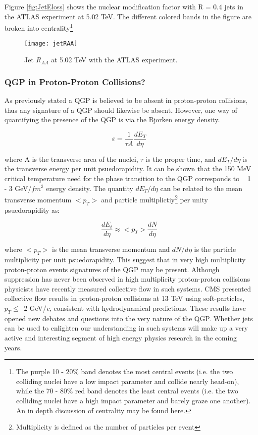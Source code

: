 Figure \ref{fig:JetEloss} shows the nuclear modification factor with R = 0.4 jets in the ATLAS experiment at 5.02 TeV\cite{Aaboud:2018twu}.  The different colored bands in the figure are broken into centrality\footnote{The purple 10 - 20\% band denotes the most central events (i.e. the two colliding nuclei have a low impact parameter and collide nearly head-on), while the 70 - 80\% red band denotes the least central events (i.e. the two colliding nuclei have a high impact parameter and barely graze one another).  An in depth discussion of centrality may be found here\cite{Klochkov_2017}.}

\begin{figure}[h]
\texttt{[image: jetRAA]}
\centering
\caption{Jet $R_{AA}$ at 5.02 TeV with the ATLAS experiment\cite{Aaboud:2018twu}.}
\label{fig:JetRAA}
\end{figure}



\subsubsection{QGP in Proton-Proton Collisions?}
As previously stated a QGP is believed to be absent in proton-proton collisions, thus any signature of a QGP should likewise be absent.  However, one way of quantifying the presence of the QGP is via the Bjorken energy density.  

\begin{equation}
\varepsilon = \frac{1}{\tau A} \frac{dE_{T}}{d \eta}
\label{eq:bjorkenEt}
\end{equation}

\noindent
where A is the transverse area of the nuclei, $\tau$ is the proper time, and $dE_{T}/d \eta$ is the transverse energy per unit psuedorapidity.  It can be shown that  the 150 MeV critical temperature need for the phase transition to the QGP corresponds to ~ 1 - 3 GeV/$fm^{3}$ energy density.  The quantity $dE_{T}/d \eta$ can be related to the mean transverse momentum $<p_{T}>$ and particle multiplictiy\footnote{Multiplicity is defined as the number of particles per event} per unity psuedorapidity as:

\begin{equation}
\frac{dE_{t}}{d \eta}  \approx  <p_{T}> \frac{dN}{d\eta}
\label{eq:Et}
\end{equation}

where $ <p_{T} >$ is the mean transverse momentum and $dN/d\eta$ is the particle multiplicity per unit psuedorapidity.  This suggest that in very high multiplicity proton-proton events signatures of the QGP may be present.  Although suppression has never been observed in high multiplicity proton-proton collisions physicists have recently measured collective flow in such systems\cite{Nagle:2018nvi}.  CMS presented collective flow results in proton-proton collisions at 13 TeV using soft-particles, $p_{T} \leq\,$ 2 GeV/\textit{c}, consistent with hydrodynamical predictions\cite{ZHAO2018495}. These results have opened new debates and questions into the very nature of the QGP.  Whether jets can be used to enlighten our understanding in such systems will make up a very active and interesting segment of high energy physics research in the coming years.